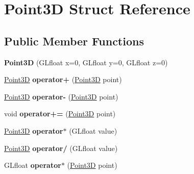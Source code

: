 \hypertarget{struct_point3_d}{\section{Point3\+D Struct Reference}
\label{struct_point3_d}
}
\subsection*{Public Member Functions}
\begin{DoxyCompactItemize}
\item 
\hypertarget{struct_point3_d_a03a8cfff43d21da2bcad81978e1c3b32}{{\bfseries Point3\+D} (G\+Lfloat x=0, G\+Lfloat y=0, G\+Lfloat z=0)}\label{struct_point3_d_a03a8cfff43d21da2bcad81978e1c3b32}

\item 
\hypertarget{struct_point3_d_adcbe6c92c5b9ab981526c90c404f2d5e}{\hyperlink{struct_point3_d}{Point3\+D} {\bfseries operator+} (\hyperlink{struct_point3_d}{Point3\+D} point)}\label{struct_point3_d_adcbe6c92c5b9ab981526c90c404f2d5e}

\item 
\hypertarget{struct_point3_d_abf8f30a54be0f396e2b16e01d1f9994c}{\hyperlink{struct_point3_d}{Point3\+D} {\bfseries operator-\/} (\hyperlink{struct_point3_d}{Point3\+D} point)}\label{struct_point3_d_abf8f30a54be0f396e2b16e01d1f9994c}

\item 
\hypertarget{struct_point3_d_a0786801cd6144da35faccb7fa1c2871a}{void {\bfseries operator+=} (\hyperlink{struct_point3_d}{Point3\+D} point)}\label{struct_point3_d_a0786801cd6144da35faccb7fa1c2871a}

\item 
\hypertarget{struct_point3_d_a03ef9abe42698842355f913aa43dfcab}{\hyperlink{struct_point3_d}{Point3\+D} {\bfseries operator$\ast$} (G\+Lfloat value)}\label{struct_point3_d_a03ef9abe42698842355f913aa43dfcab}

\item 
\hypertarget{struct_point3_d_a7dd6c71db077570810dbb0a08545a147}{\hyperlink{struct_point3_d}{Point3\+D} {\bfseries operator/} (G\+Lfloat value)}\label{struct_point3_d_a7dd6c71db077570810dbb0a08545a147}

\item 
\hypertarget{struct_point3_d_ad96d5781f0dba88c6fc5f28b5aa1bcbc}{G\+Lfloat {\bfseries operator$\ast$} (\hyperlink{struct_point3_d}{Point3\+D} point)}\label{struct_point3_d_ad96d5781f0dba88c6fc5f28b5aa1bcbc}


\end{DoxyCompactItemize}
